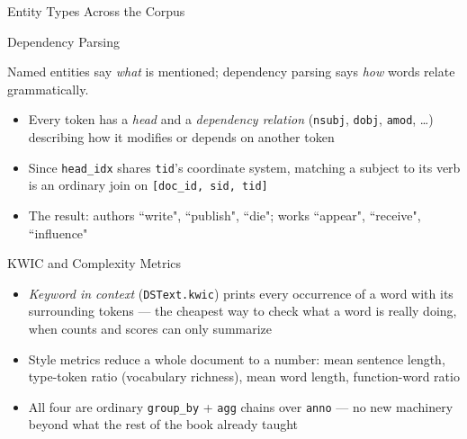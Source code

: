 \documentclass[8pt,aspectratio=169]{beamer}
\begin{document}
\begin{rightframe}{Entity Types Across the Corpus}
\end{rightframe}

\begin{textframe}{Dependency Parsing}

Named entities say \textit{what} is mentioned; dependency parsing says \textit{how} words relate grammatically.

\begin{itemize}
\item Every token has a \textit{head} and a \textit{dependency relation} (\texttt{nsubj}, \texttt{dobj}, \texttt{amod}, \dots) describing how it modifies or depends on another token
\item Since \texttt{head\_idx} shares \texttt{tid}'s coordinate system, matching a subject to its verb is an ordinary join on \texttt{[doc\_id, sid, tid]}
\item The result: authors ``write", ``publish", ``die"; works ``appear", ``receive", ``influence"
\end{itemize}

\end{textframe}

\begin{textframe}{KWIC and Complexity Metrics}

\begin{itemize}
\item \textit{Keyword in context} (\texttt{DSText.kwic}) prints every occurrence of a word with its surrounding tokens --- the cheapest way to check what a word is really doing, when counts and scores can only summarize
\item Style metrics reduce a whole document to a number: mean sentence length, type-token ratio (vocabulary richness), mean word length, function-word ratio
\item All four are ordinary \texttt{group\_by} + \texttt{agg} chains over \texttt{anno} --- no new machinery beyond what the rest of the book already taught
\end{itemize}

\end{textframe}
\end{document}
